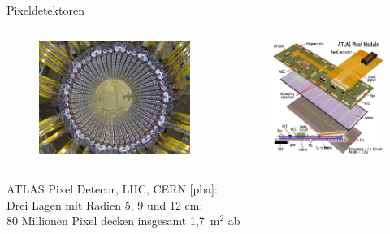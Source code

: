 \begin{frame}{Pixeldetektoren}
    \begin{columns}[T]
				\begin{figure}[htbp]
				  \centering
				  \includegraphics[width=\columnwidth]{bilder/beispiele/pixel_layer.jpg}
				\end{figure}

		 	 \centering	 
				\begin{figure}[htbp]
				  \centering
				  \includegraphics[width=0.9\columnwidth]{bilder/beispiele/module.jpg}
				\end{figure}
    \end{columns}
    \vspace{.6cm}
			ATLAS Pixel Detecor, LHC, CERN [pba]:\\
			Drei Lagen mit Radien 5, 9 und 12 cm;\\ 80 Millionen Pixel decken insgesamt 1,7~m$^2$ ab
\end{frame}
